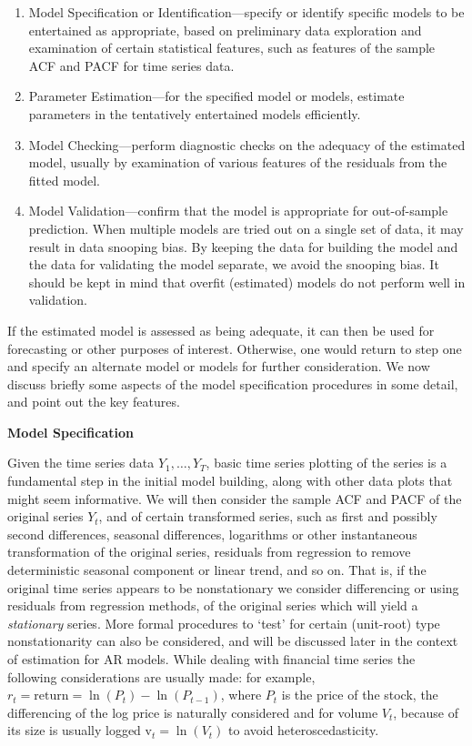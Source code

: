 \begin{enumerate}
\item Model Specification or Identification---specify or identify specific models to be entertained as appropriate, based on preliminary data exploration and examination of certain statistical features, such as features of the sample ACF and PACF for time series data.

\item Parameter Estimation---for the specified model or models, estimate parameters in the tentatively entertained models efficiently.

\item Model Checking---perform diagnostic checks on the adequacy of the estimated model, usually by examination of various features of the residuals from the fitted model.

\item Model Validation---confirm that the model is appropriate for out-of-sample prediction. When multiple models are tried out on a single set of data, it may result in data snooping bias. By keeping the data for building the model and the data for validating the model separate, we avoid the snooping bias. It should be kept in mind that overfit (estimated) models do not perform well in validation.
\end{enumerate}


If the estimated model is assessed as being adequate, it can then be used for forecasting or other purposes of interest. Otherwise, one would return to step one and specify an alternate model or models for further consideration. We now discuss briefly some aspects of the model specification procedures in some detail, and point out the key features. \twomedskip


{\noindent\bfseries\large Model Specification} \twomedskip


Given the time series data $Y_1, \ldots, Y_T$, basic time series  plotting of the series is a fundamental step in the initial model building, along with other data plots that might seem informative. We will then consider the sample ACF and PACF of the original series $Y_t$, and of certain transformed series, such as first and possibly second differences, seasonal differences, logarithms or other instantaneous transformation of the original series, residuals from regression to remove deterministic seasonal component or linear trend, and so on. That is, if the original time series appears to be nonstationary we consider differencing or using residuals from regression methods, of the original series which will yield a \emph{stationary} series. More formal procedures to `test' for certain (unit-root) type nonstationarity can also be considered, and will be discussed later in the context of estimation for AR models.  While dealing with financial time series the following considerations are usually made: for example, $r_t= \text{return} = \ln(P_t) - \ln(P_{t-1})$, where $P_t$ is the price of the stock, the differencing of the log price is naturally considered and for volume $V_t$, because of its size is usually logged $\text{v}_t= \ln(V_t)$ to avoid heteroscedasticity.


